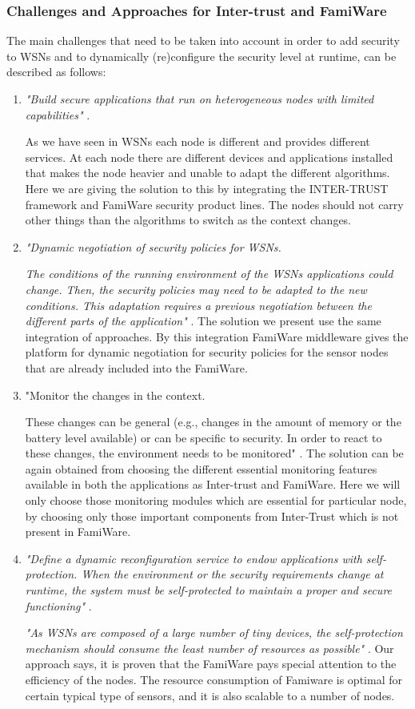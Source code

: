 \documentclass[12pt,a4paper,twoside]{report}
\begin{document}
\subsubsection{Challenges and Approaches for Inter-trust and FamiWare}
The main challenges that need to be taken into account in order to add security to WSNs and to dynamically (re)configure the security level at runtime, can be described as follows:
\begin{enumerate}
	\item  \emph{"Build secure applications that run on heterogeneous nodes with limited capabilities"} \cite{Pinto;etal:2013}.\par
As we have seen in WSNs each node is different and provides different services. At each node there are different devices and applications installed that makes the node heavier and unable to adapt the different algorithms. Here we are giving the solution to this by integrating the INTER-TRUST framework and FamiWare security product lines. The nodes should not carry other things than the algorithms to switch as the context changes.
	\item  \emph{"Dynamic negotiation of security policies for WSNs.}\par
	\emph{The conditions of the running environment of the WSNs applications could change. Then, the security policies may need to be adapted to the new conditions. This adaptation requires a previous negotiation between the different parts of the application"} \cite{Pinto;etal:2013}. The solution we present use the same integration of approaches. By this integration FamiWare middleware gives the platform for dynamic negotiation for security policies for the sensor nodes that are already included into the FamiWare.
	\item  "Monitor the changes in the context.\par
	These changes can be general (e.g., changes in the amount of memory or the battery level available) or can be specific to security. In order to react to these changes, the environment needs to be monitored" \cite{Pinto;etal:2013}. The solution can be again obtained from choosing the different essential monitoring features available in both the applications as Inter-trust and FamiWare. Here we will only choose those monitoring modules which are essential for particular node, by choosing only those important components from Inter-Trust which is not present in FamiWare.  
	\item \emph{"Define a dynamic reconfiguration service to endow applications with self-protection.
When the environment or the security requirements change at runtime, the system must be self-protected to maintain a proper and secure functioning"} \cite{Pinto;etal:2013}. \par
\emph{"As WSNs are composed of a large number of tiny devices, the self-protection mechanism should consume the least number of resources as possible"} \cite{Pinto;etal:2013}. Our approach says, it is proven that the FamiWare pays special attention to the efficiency of the nodes. The resource consumption of Famiware is optimal for certain typical type of sensors, and it is also scalable to a number of nodes.
\end{enumerate}
\end{document}

